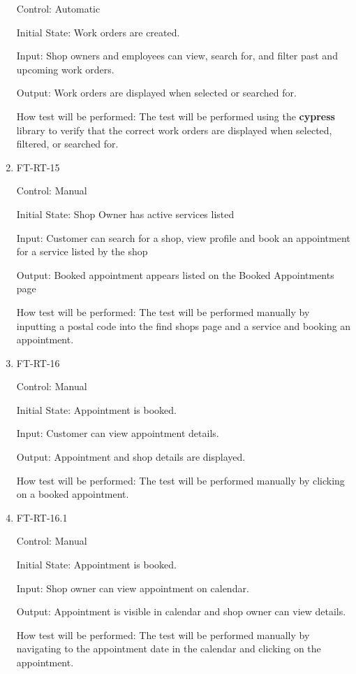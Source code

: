 \documentclass[12pt, titlepage]{article}
\begin{document}
\begin{enumerate}
Control: Automatic

Initial State: Work orders are created.

Input: Shop owners and employees can view, search for, and filter past and upcoming work orders.

Output: Work orders are displayed when selected or searched for.

How test will be performed: The test will be performed using the \textbf{cypress} library to verify that the correct work orders are displayed when selected, filtered, or searched for.

\item{FT-RT-15\\}

Control: Manual

Initial State: Shop Owner has active services listed

Input: Customer can search for a shop, view profile and book an appointment for a service listed by the shop

Output: Booked appointment appears listed on the Booked Appointments page

How test will be performed: The test will be performed manually by inputting a postal code into the find shops page and a service and booking an appointment.

\item{FT-RT-16\\}

Control: Manual

Initial State: Appointment is booked.

Input: Customer can view appointment details.

Output: Appointment and shop details are displayed.

How test will be performed: The test will be performed manually by clicking on a booked appointment.

\item{FT-RT-16.1\\}

Control: Manual

Initial State: Appointment is booked.

Input: Shop owner can view appointment on calendar.

Output: Appointment is visible in calendar and shop owner can view details.

How test will be performed: The test will be performed manually by navigating to the appointment date in the calendar and clicking on the appointment.


\end{enumerate}
\end{document}
